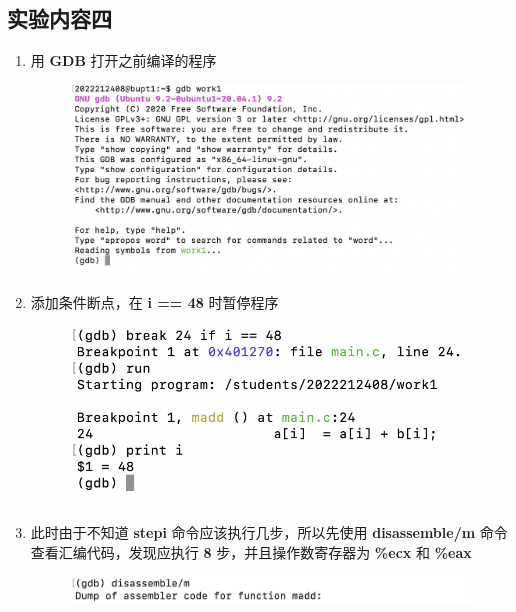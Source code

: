 \documentclass[UTF8, 12pt, a4paper, oneside]{ctexart}
\begin{document}
        \subsection{实验内容四}
            \begin{enumerate}
                \item 用 \textbf{GDB} 打开之前编译的程序
                    \begin{figure}[htbp]
                        \includegraphics*[width = 14cm]{4.1.png}
                    \end{figure}
                \newpage
                \item 添加条件断点，在 \textbf{i == 48} 时暂停程序
                    \begin{figure}[htbp]
                        \includegraphics*[width = 12cm]{4.2.png}
                    \end{figure}
                \item 此时由于不知道 \textbf{stepi} 命令应该执行几步，所以先使用 \textbf{disassemble/m} 命令查看汇编代码，发现应执行 \textbf{8} 步，并且操作数寄存器为 \textbf{\%ecx} 和 \textbf{\%eax}
                    \begin{figure}[htbp]
                        \includegraphics*[width = 18cm]{4.4.png}

\end{figure}
\end{enumerate}
\end{document}

